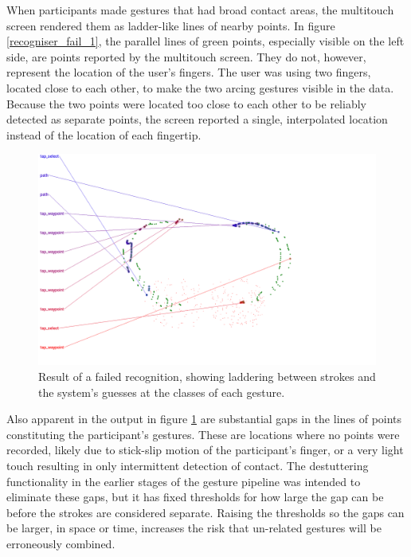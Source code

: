 When participants made gestures that had broad contact areas, the multitouch screen rendered them as ladder-like lines of nearby points. 
In figure \ref{recogniser_fail_1}, the parallel lines of green points, especially visible on the left side, are points reported by the multitouch screen. 
They do not, however, represent the location of the user's fingers.
The user was using two fingers, located close to each other, to make the two arcing gestures visible in the data. 
Because the two points were located too close to each other to be reliably detected as separate points, the screen reported a single, interpolated location instead of the location of each fingertip. 

\begin{figure}
	\centering
	\includegraphics[width=\textwidth]{../../software/tool/test_pipeline/good_run/u10_c1000_t6/u10_c1000_t6_gestures.png}
	\caption{Result of a failed recognition, showing laddering between strokes and the system's guesses at the classes of each gesture.}
	\label{recognizer_fail_1}
\end{figure}

Also apparent in the output in figure \ref{recognizer_fail_1} are substantial gaps in the lines of points constituting the participant's gestures. 
These are locations where no points were recorded, likely due to stick-slip motion of the participant's finger, or a very light touch resulting in only intermittent detection of contact. 
The destuttering functionality in the earlier stages of the gesture pipeline was intended to eliminate these gaps, but it has fixed thresholds for how large the gap can be before the strokes are considered separate. 
Raising the thresholds so the gaps can be larger, in space or time, increases the risk that un-related gestures will be erroneously combined.


